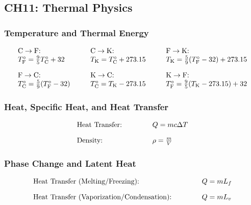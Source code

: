 \documentclass[12pt,a4paper]{article}
\begin{document}
\subsection{CH11: Thermal Physics}

\subsubsection{Temperature and Thermal Energy}
\begin{align*}
\begin{array}{l@{\hspace{1cm}}l@{\hspace{1cm}}l}
\text{C} \rightarrow \text{F:} & \text{C} \rightarrow \text{K:} & \text{F} \rightarrow \text{K:} \\
T^{\circ}_\mathrm{F} = \frac{9}{5}T^{\circ}_\mathrm{C} + 32 & T_\mathrm{K} = T^{\circ}_\mathrm{C} + 273.15 & T_\mathrm{K} = \frac{5}{9}(T^{\circ}_\mathrm{F} - 32) + 273.15 \\[1em]
\text{F} \rightarrow \text{C:} & \text{K} \rightarrow \text{C:} & \text{K} \rightarrow \text{F:} \\
T^{\circ}_\mathrm{C} = \frac{5}{9}(T^{\circ}_\mathrm{F} - 32) & T^{\circ}_\mathrm{C} = T_\mathrm{K} - 273.15 & T^{\circ}_\mathrm{F} = \frac{9}{5}(T_\mathrm{K} - 273.15) + 32
\end{array}
\end{align*}

\subsubsection{Heat, Specific Heat, and Heat Transfer}
\begin{align*}
\begin{array}{l@{\hspace{1.5cm}}l}
\text{Heat Transfer:} & Q = mc\Delta T \\[1em]
\text{Density:} & \rho = \frac{m}{V}
\end{array}
\end{align*}

\subsubsection{Phase Change and Latent Heat}
\begin{align*}
\begin{array}{l@{\hspace{1.5cm}}l}
\text{Heat Transfer (Melting/Freezing):} & Q = mL_f \\[1em]
\text{Heat Transfer (Vaporization/Condensation):} & Q = mL_v
\end{array}
\end{align*}
\end{document}
